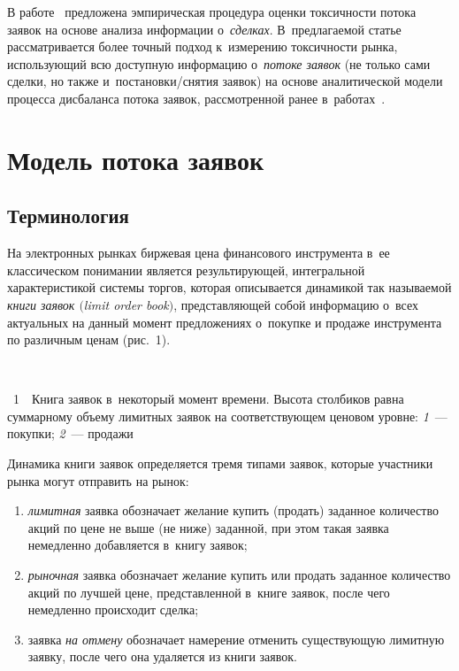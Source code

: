 \begin{multicols}{2}
В работе~\cite{Easley2012} предложена эмпирическая процедура оценки
токсичности потока заявок на основе анализа информации о~\textit{сделках}.
В~предлагаемой статье рассматривается более точный подход
к~измерению токсичности рынка, использующий всю доступную информацию
о~\textit{потоке заявок} (не только сами сделки, но также
и~по\-ста\-нов\-ки/сня\-тия заявок) на основе аналитической модели процесса
дисбаланса потока заявок, рассмотренной ранее в~работах~\cite{Korolev_2013, Chertok2014}.

\section{Модель потока заявок}

\subsection{Терминология}

На электронных рынках биржевая цена финансового инструмента в~ее
классическом понимании является результирующей, интегральной
характеристикой системы торгов, которая описывается динамикой так
называемой {\it книги заявок $($limit order book$)$}, представляющей
собой информацию о~всех актуальных на данный момент предложениях
о~покупке и продаже инструмента по различным ценам (рис.~1).

\begin{center}  %
\vspace*{8pt}
\mbox{%
\epsfxsize=79.096mm
}
\end{center}

\noindent
{{\figurename~1}\ \ \small{Книга заявок в~некоторый момент времени. Высота столбиков равна
  суммарному объему лимитных заявок на соответствующем ценовом уровне:
\textit{1}~--- покупки; \textit{2}~--- продажи}}


\vspace*{9pt}


\addtocounter{figure}{1}



Динамика книги заявок определяется тремя типами
заявок, которые участники рынка могут отправить на рынок:
\begin{enumerate}[(1)]
\item {\it лимитная} заявка обозначает желание купить (продать)
заданное количество акций по цене не выше (не ниже) заданной, при
этом такая заявка немедленно добавляется в~книгу заявок;
\item {\it рыночная} заявка обозначает желание купить или продать
заданное количество акций по лучшей цене, представленной в~книге
заявок, после чего немедленно происходит сделка;
\item заявка {\it на отмену} обозначает намерение отменить
существующую лимитную заявку, после чего она удаляется из книги заявок.
\end{enumerate}




\end{multicols}
